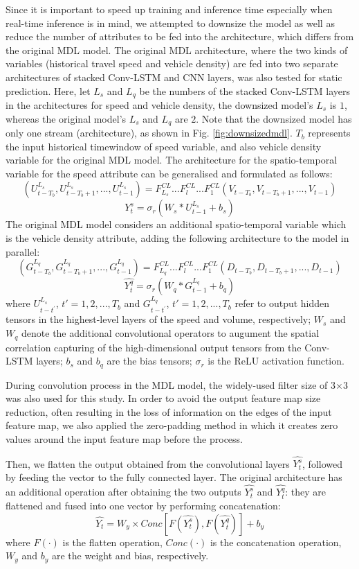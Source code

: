 \documentclass[11pt]{uonthesis}
\begin{document}
Since it is important to speed up training and inference time especially when real-time inference is in mind, we attempted to downsize the model as well as reduce the number of attributes to be fed into the architecture, which differs from the original MDL model. The original MDL architecture, where the two kinds of variables (historical travel speed and vehicle density) are fed into two separate architectures of stacked Conv-LSTM and CNN layers, was also tested for static prediction. Here, let $L_s$ and $L_q$ be the numbers of the stacked Conv-LSTM layers in the architectures for speed and vehicle density, the downsized model's $L_s$ is $1$, whereas the original model's $L_s$ and $L_q$ are $2$. Note that the downsized model has only one stream (architecture), as shown in Fig. \ref{fig:downsizedmdl}. $T_b$ represents the input historical timewindow of speed variable, and also vehicle density variable for the original MDL model. The architecture for the spatio-temporal variable for the speed attribute can be generalised and formulated as follows:
\[ (U^{L_s}_{t-T_b}, U^{L_s}_{t-T_b+1},..., U^{L_s}_{t-1}) = F^{CL}_{L_s}...F^{CL}_{l}...F^{CL}_{1} (V_{t-T_b}, V_{t-T_b+1},..., V_{t-1}) \]
\[ \hat{Y^s_{t}} = {\sigma}_r (W_s\ast{U^{L_s}_{t-1}} + b_s) \]
The original MDL model considers an additional spatio-temporal variable which is the vehicle density attribute, adding the following architecture to the model in parallel:
\[ (G^{L_q}_{t-T_b}, G^{L_q}_{t-T_b+1},...,G^{L_q}_{t-1}) = F^{CL}_{L_q}...F^{CL}_{l}...F^{CL}_{1} (D_{t-T_b}, D_{t-T_b+1},..., D_{t-1}) \]
\[ \hat{Y^q_{t}} = {\sigma}_r (W_q\ast{G^{L_q}_{t-1}} + b_q) \]
where $U^{L_s}_{t-t^{\prime}}$, $t\prime = 1, 2,..., T_b$ and $G^{L_q}_{t-t^{\prime}}$, $t\prime = 1, 2,..., T_b$ refer to output hidden tensors in the highest-level layers of the speed and volume, respectively; $W_s$ and $W_q$ denote the additional convolutional operators to augument the spatial correlation capturing of the high-dimensional output tensors from the Conv-LSTM layers; $b_s$ and $b_q$ are the bias tensors; $\sigma_r$ is the ReLU activation function.

During convolution process in the MDL model, the widely-used filter size of 3$\times$3 was also used for this study. In order to avoid the output feature map size reduction, often resulting in the loss of information on the edges of the input feature map, we also applied the zero-padding method in which it creates zero values around the input feature map before the process.

Then, we flatten the output obtained from the convolutional layers $\hat{Y^{s}_t}$, followed by feeding the vector to the fully connected layer. The original architecture has an additional operation after obtaining the two outputs $\hat{Y^{s}_t}$ and $\hat{Y^q_t}$: they are flattened and fused into one vector by performing concatenation:
\[ \hat{Y_t} = W_y \times Conc[F(\hat{Y^s_t}), F(\hat{Y^q_t})] + b_y\]
where $F(\cdot)$ is the flatten operation, $Conc(\cdot)$ is the concatenation operation, $W_y$ and $b_y$ are the weight and bias, respectively. %
\end{document}
